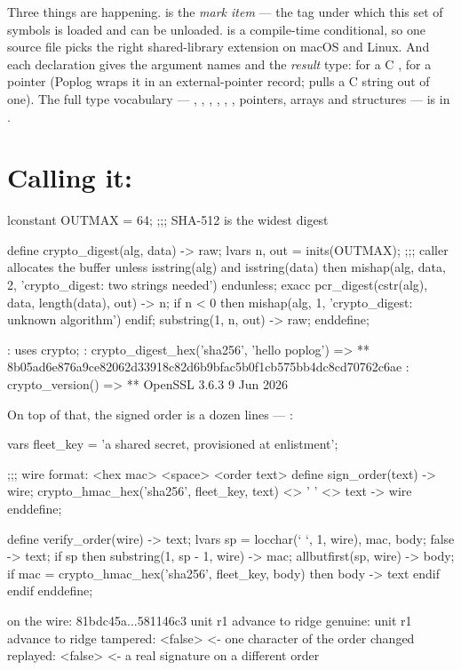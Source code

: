 Three things are happening.  is the \emph{mark item} --- the
tag under which this set of symbols is loaded and can be unloaded.
 is a compile-time conditional, so one source file picks the
right shared-library extension on macOS and Linux. And each declaration gives
the argument names and the \emph{result} type:  for a C ,
 for a pointer (Poplog wraps it in an external-pointer record;
 pulls a C string out of one). The full type vocabulary
--- , , , , ,
, pointers, arrays and structures --- is in .

\section{Calling it: }

\begin{pop}
lconstant OUTMAX = 64;              ;;; SHA-512 is the widest digest

define crypto_digest(alg, data) -> raw;
    lvars n, out = inits(OUTMAX);   ;;; caller allocates the buffer
    unless isstring(alg) and isstring(data) then
        mishap(alg, data, 2, 'crypto_digest: two strings needed')
    endunless;
    exacc pcr_digest(cstr(alg), data, length(data), out) -> n;
    if n < 0 then
        mishap(alg, 1, 'crypto_digest: unknown algorithm')
    endif;
    substring(1, n, out) -> raw;
enddefine;
\end{pop}

\begin{repl}
: uses crypto;
: crypto_digest_hex('sha256', 'hello poplog') =>
** 8b05ad6e876a9ce82062d33918c82d6b9bfac5b0f1cb575bb4dc8cd70762c6ae
: crypto_version() =>
** OpenSSL 3.6.3 9 Jun 2026
\end{repl}

On top of that, the signed order is a dozen lines --- :

\begin{pop}
vars fleet_key = 'a shared secret, provisioned at enlistment';

;;; wire format:  <hex mac> <space> <order text>
define sign_order(text) -> wire;
    crypto_hmac_hex('sha256', fleet_key, text) <> ' ' <> text -> wire
enddefine;

define verify_order(wire) -> text;
    lvars sp = locchar(` `, 1, wire), mac, body;
    false -> text;
    if sp then
        substring(1, sp - 1, wire) -> mac;
        allbutfirst(sp, wire) -> body;
        if mac = crypto_hmac_hex('sha256', fleet_key, body) then body -> text endif
    endif
enddefine;
\end{pop}
\begin{repl}
on the wire: 81bdc45a...581146c3 unit r1 advance to ridge
genuine:     unit r1 advance to ridge
tampered:    <false>          <- one character of the order changed
replayed:    <false>          <- a real signature on a different order
\end{repl}

